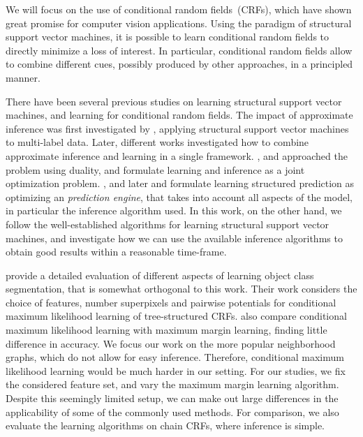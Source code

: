 We will focus on the use of conditional random fields~(CRFs), which have shown
great promise for computer vision applications. Using the paradigm of
structural support vector machines, it is possible to learn conditional random
fields to directly minimize a loss of interest. In particular, conditional
random fields allow to combine different cues, possibly produced by other
approaches, in a principled manner.

There have been several previous studies on learning structural support vector machines,
and learning for conditional random fields. The impact of approximate inference was first
investigated by \citet{finley2008training}, applying structural support vector machines
to multi-label data. Later, different works investigated how to combine approximate inference and
learning in a single framework. \citet{meshi2010learning, komodakis2011efficient}, and \citet{hazan2010primal} approached
the problem using duality, and formulate learning and inference as a joint optimization problem.
\citet{stoyanov2011empirical}, and later \citet{jancsarylearning} and  \citet{krahenbuhlparameter} formulate learning
structured prediction as optimizing an \emph{prediction engine}, that takes into account all aspects
of the model, in particular the inference algorithm used.
In this work, on the other hand, we follow the well-established algorithms for learning structural
support vector machines, and investigate how we can use the available inference algorithms to
obtain good results within a reasonable time-frame.

\citet{nowozin2010parameter} provide a detailed evaluation of different aspects of learning object class
segmentation, that is somewhat orthogonal to this work. Their work considers the choice of features,
number superpixels and pairwise potentials for conditional maximum likelihood learning of tree-structured CRFs.
\citet{nowozin2010parameter} also compare conditional maximum likelihood learning with maximum margin learning,
finding little difference in accuracy.
We focus our work on the more popular neighborhood graphs, which do not allow for easy inference.
Therefore, conditional maximum likelihood learning would be much harder in our setting. For our studies,
we fix the considered feature set, and vary the maximum margin learning algorithm. Despite
this seemingly limited setup, we can make out large differences in the applicability of
some of the commonly used methods. For comparison, we also evaluate the learning algorithms
on chain CRFs, where inference is simple.

